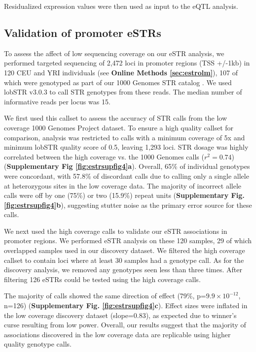 Residualized expression values were then used as input to the eQTL
analysis.

\subsection{Validation of promoter eSTRs}

To assess the affect of low sequencing coverage on our eSTR analysis, we performed targeted sequencing of 2,472 loci in promoter regions (TSS +/-1kb) in 120 CEU and YRI individuals (see \textbf{Online Methods \ref{sec:estrolm}}), 107 of which were genotyped as part of our 1000 Genomes STR catalog \cite{WillemsGymrekHighnamEtAl2014}. We used lobSTR v3.0.3 to call STR genotypes from these reads. The median number of informative reads per locus was 15. 

We first used this callset to assess the accuracy of STR calls from the low coverage 1000 Genomes Project dataset. To ensure a high quality callset for comparison, analysis was restricted to calls with a minimum coverage of 5x and minimum lobSTR quality score of 0.5, leaving 1,293 loci. STR dosage was highly correlated between the high coverage vs. the 1000 Genomes calls ($r^2=0.74$) (\textbf{Supplementary Fig \ref{fig:estrsupfig4}a}). Overall, 65\% of individual genotypes were concordant, with 57.8\% of discordant calls due to calling only a single allele at heterozygous sites in the low coverage data. The majority of incorrect allele calls were off by one (75\%) or two (15.9\%) repeat units (\textbf{Supplementary Fig. \ref{fig:estrsupfig4}b}), suggesting stutter noise as the primary error source for these calls.

We next used the high coverage calls to validate our eSTR associations in promoter regions. We performed eSTR analysis on these 120 samples, 29 of which overlapped samples used in our discovery dataset. We filtered the high coverage callset to contain loci where at least 30 samples had a genotype call. As for the discovery analysis, we removed any genotypes seen less than three times. After filtering 126 eSTRs could be tested using the high coverage calls.

The majority of calls showed the same direction of effect (79\%, p=$9.9 \times 10^{-12}$, n=126) (\textbf{Supplementary Fig. \ref{fig:estrsupfig4}c}). Effect sizes were inflated in the low coverage discovery dataset (slope=0.83), as expected due to winner's curse resulting from low power. Overall, our results suggest that the majority of associations discovered in the low coverage data are replicable using higher quality genotype calls.

